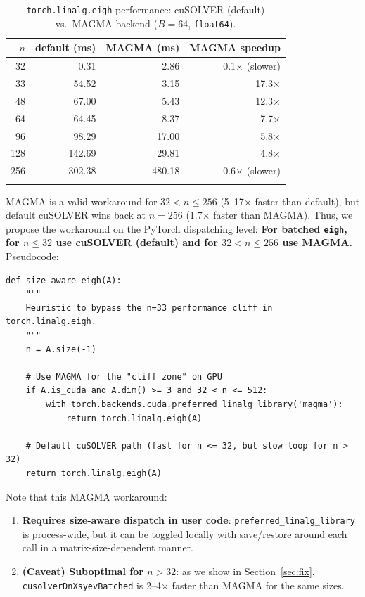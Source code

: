 \documentclass[10pt, letterpaper]{article}
\begin{document}
\begin{table}[h]
\centering
\caption{\texttt{torch.linalg.eigh} performance: cuSOLVER (default) vs.\ MAGMA backend ($B = 64$, \texttt{float64}).}
\label{tab:magma}
\begin{tabular}{r rrr}
\toprule
$n$ & default (ms) & MAGMA (ms) & MAGMA speedup \\
\midrule
 32 & 0.31  & 2.86  & 0.1$\times$ (slower) \\
 33 & 54.52 & 3.15  & 17.3$\times$ \\
 48 & 67.00 & 5.43  & 12.3$\times$ \\
 64 & 64.45 & 8.37  & 7.7$\times$ \\
 96 & 98.29 & 17.00 & 5.8$\times$ \\
128 & 142.69 & 29.81 & 4.8$\times$ \\
256 & 302.38 & 480.18 & 0.6$\times$ (slower) \\
\bottomrule
\label{table2}
\end{tabular}
\end{table}

MAGMA is a valid workaround for $32 < n \le 256$
(5--17$\times$ faster than default), but default cuSOLVER wins back
at $n = 256$ (1.7$\times$ faster than MAGMA).
Thus, we propose the workaround on the PyTorch dispatching level:
\textbf{For batched \texttt{eigh}, for $n \le 32$ use cuSOLVER (default)
and for $32 < n \le 256$ use MAGMA.}
Pseudocode:
\begin{lstlisting}[style=python]
    def size_aware_eigh(A):
    """
    Heuristic to bypass the n=33 performance cliff in torch.linalg.eigh.
    """
    n = A.size(-1)

    # Use MAGMA for the "cliff zone" on GPU
    if A.is_cuda and A.dim() >= 3 and 32 < n <= 512:
        with torch.backends.cuda.preferred_linalg_library('magma'):
            return torch.linalg.eigh(A)

    # Default cuSOLVER path (fast for n <= 32, but slow loop for n > 32)
    return torch.linalg.eigh(A)
\end{lstlisting}
Note that this MAGMA workaround:
\begin{enumerate}
    \item \textbf{Requires size-aware dispatch in user code}:
    \texttt{preferred\_linalg\_library} is process-wide, but it can be
    toggled locally with save/restore around each call in a matrix-size-dependent manner.  
    \item \textbf{(Caveat) Suboptimal for $n > 32$}: as we show in
    Section~\ref{sec:fix}, \texttt{cusolverDnXsyevBatched} is 2--4$\times$
    faster than MAGMA for the same sizes.
\end{enumerate}
\end{document}
